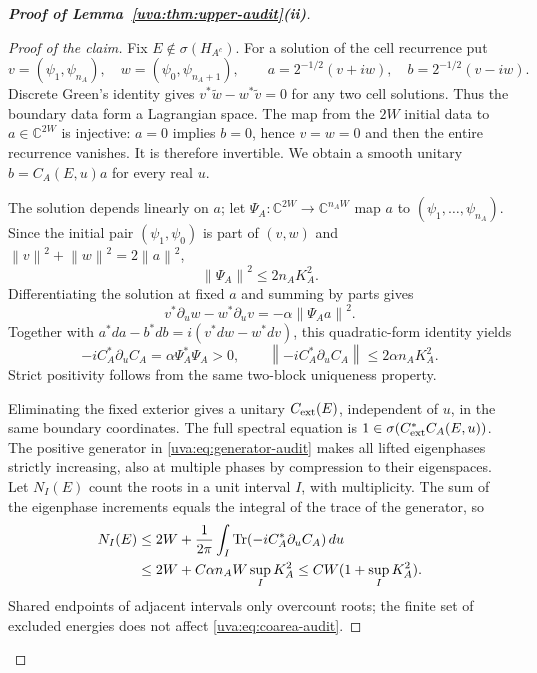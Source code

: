 \documentclass[11pt]{article}
\numberwithin{equation}{section}
\theoremstyle{remark}
\newcommand{\C}{\mathbb C}
\newcommand{\Tr}{\operatorname{Tr}}
\newcommand{\norm}[1]{\left\|#1\right\|}
\begin{document}
\begin{proof}[\textbf{Proof of Lemma~\ref{uva:thm:upper-audit}\textup{(ii)}}]
\begin{proof}[Proof of the claim]
Fix $E\notin\sigma(H_{A^c})$.
For a solution of the cell recurrence put
\[
 v=(\psi_1,\psi_{n_A}),\quad w=(\psi_0,\psi_{n_A+1}),\qquad
 a=2^{-1/2}(v+iw),\quad b=2^{-1/2}(v-iw).
\]
Discrete Green's identity gives
$v^*\widetilde w-w^*\widetilde v=0$ for any two cell solutions.
Thus the boundary data form a Lagrangian space. The map from the
$2W$ initial data to $a\in\C^{2W}$ is injective: $a=0$ implies
$b=0$, hence $v=w=0$ and then the entire recurrence vanishes.
It is therefore invertible. We obtain a smooth unitary
$b=C_A(E,u)a$ for every real $u$.

The solution depends linearly on $a$; let
$\Psi_A:\C^{2W}\to\C^{n_AW}$ map $a$ to $(\psi_1,\ldots,\psi_{n_A})$.
Since the initial pair $(\psi_1,\psi_0)$ is part of $(v,w)$ and
$\norm v^2+\norm w^2=2\norm a^2$,
\begin{equation}\label{uva:eq:psi}
 \norm{\Psi_A}^2\le2n_AK_A^2.
\end{equation}
Differentiating the solution at fixed $a$ and summing by parts gives
\[
 v^*\partial_uw-w^*\partial_uv=-\alpha\norm{\Psi_Aa}^2.
\]
Together with $a^*da-b^*db=i(v^*dw-w^*dv)$, this quadratic-form
identity yields
\begin{equation}\label{uva:eq:generator-audit}
 -iC_A^*\partial_uC_A=\alpha\Psi_A^*\Psi_A>0,\qquad
 \norm{-iC_A^*\partial_uC_A}\le2\alpha n_AK_A^2.
\end{equation}
Strict positivity follows from the same two-block uniqueness property.

Eliminating the fixed exterior gives a unitary $C_{\rm ext}(E)$,
independent of $u$, in the same boundary coordinates. The full spectral
equation is $1\in\sigma(C_{\rm ext}^*C_A(E,u))$.
The positive generator in \eqref{uva:eq:generator-audit} makes all
lifted eigenphases strictly increasing, also at multiple phases by
compression to their eigenspaces. Let $N_I(E)$ count the roots in a
unit interval $I$, with multiplicity. The sum of the eigenphase increments
equals the integral of the trace of the generator, so
\begin{align}
 N_I(E)&\le2W+\frac1{2\pi}\int_I
                  \Tr(-iC_A^*\partial_uC_A)\,du\notag\\
 &\le2W+C\alpha n_AW\sup_IK_A^2
 \le CW(1+\sup_IK_A^2).\label{uva:eq:cross-audit}
\end{align}
Shared endpoints of adjacent intervals only overcount roots; the finite
set of excluded energies does not affect \eqref{uva:eq:coarea-audit}.


\end{proof}
\end{proof}
\end{document}
